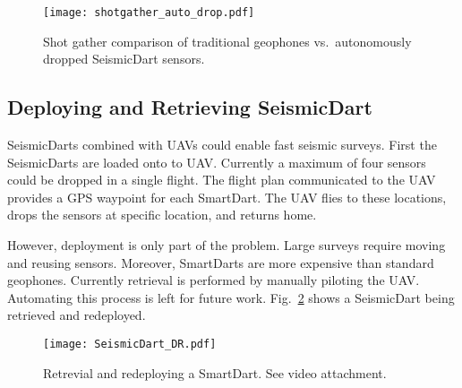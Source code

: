 \begin{figure} \centering
  {\texttt{[image: shotgather\_auto\_drop.pdf]}}
 \caption{Shot gather comparison of traditional geophones vs.\ autonomously dropped SeismicDart sensors. 
 \label{fig:shotgather_auto_drop}}
\end{figure}

\subsection{Deploying and Retrieving SeismicDart}
SeismicDarts combined with UAVs could enable fast seismic surveys.
First the SeismicDarts are loaded onto to UAV. 
Currently a maximum of four sensors could be dropped in a single flight. 
The flight plan communicated to the UAV provides a GPS waypoint for each SmartDart. 
The UAV flies to these locations, drops the sensors at specific location, and returns home. 

However, deployment is only part of the problem. Large surveys require moving and reusing sensors.  
Moreover, SmartDarts are more expensive than standard geophones. 
Currently retrieval is performed by manually piloting the UAV. 
Automating this process is left for future work.
Fig.~\ref{fig:SeismicDart_DR} shows a SeismicDart being retrieved and redeployed.


\begin{figure} \centering
  {\texttt{[image: SeismicDart\_DR.pdf]}}
 \caption{Retrevial and redeploying a SmartDart.  See video  attachment. 
 \label{fig:SeismicDart_DR}}
\end{figure}
 